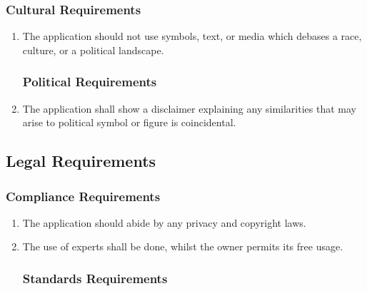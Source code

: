 \documentclass[]{article}
\begin{document}
\subsubsection{Cultural Requirements}
\label{ssub:cultural_requirements}
\begin{enumerate}[{CP}1. ]
	\item The application should not use symbols, text, or media which debases a race, culture, or a political landscape.

\subsubsection{Political Requirements}
\label{ssub:political_requirements}
	\item The application shall show a disclaimer explaining any similarities that may arise to political symbol or figure is coincidental.
\end{enumerate}


\subsection{Legal Requirements}
\label{sub:legal_requirements}

\subsubsection{Compliance Requirements}
\label{ssub:compliance_requirements}
\begin{enumerate}[{LR}1. ]
	\item The application should abide by any privacy and copyright laws.
	\item The use of experts shall be done, whilst the owner permits its free usage.

\subsubsection{Standards Requirements}
\label{ssub:standards_requirements}
\end{enumerate}


\newpage
\appendix
\end{document}
